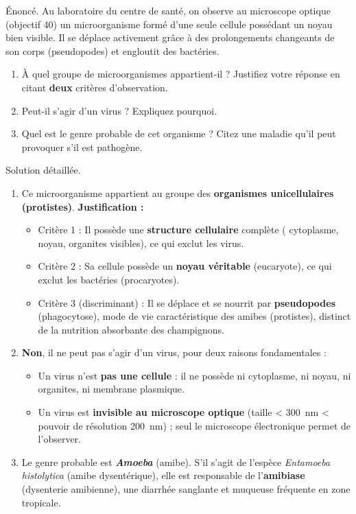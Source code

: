 \documentclass[11pt]{article}
\begin{document}
\begin{exoresolu}
Énoncé. Au laboratoire du centre de santé, on observe au microscope optique (objectif \SI{40}{\times}) un microorganisme formé d'une seule cellule possédant un noyau bien visible. Il se déplace activement grâce à des prolongements changeants de son corps (pseudopodes) et engloutit des bactéries.
\begin{enumerate}
\item À quel groupe de microorganismes appartient-il ? Justifiez votre réponse en citant \textbf{deux} critères d'observation.
\item Peut-il s'agir d'un virus ? Expliquez pourquoi.
\item Quel est le genre probable de cet organisme ? Citez une maladie qu'il peut provoquer s'il est pathogène.
\end{enumerate}
\tcblower
Solution détaillée.
\begin{enumerate}
\item Ce microorganisme appartient au groupe des \textbf{organismes unicellulaires (protistes)}.
      \textbf{Justification :}
      \begin{itemize}
      \item Critère 1 : Il possède une \textbf{structure cellulaire} complète ( cytoplasme, noyau, organites visibles), ce qui exclut les virus.
      \item Critère 2 : Sa cellule possède un \textbf{noyau véritable} (eucaryote), ce qui exclut les bactéries (procaryotes).
      \item Critère 3 (discriminant) : Il se déplace et se nourrit par \textbf{pseudopodes} (phagocytose), mode de vie caractéristique des amibes (protistes), distinct de la nutrition absorbante des champignons.
      \end{itemize}
\item \textbf{Non}, il ne peut pas s'agir d'un virus, pour deux raisons fondamentales :
      \begin{itemize}
      \item Un virus n'est \textbf{pas une cellule} : il ne possède ni cytoplasme, ni noyau, ni organites, ni membrane plasmique.
      \item Un virus est \textbf{invisible au microscope optique} (taille < \SI{300}{\nano\meter} < pouvoir de résolution \approx \SI{200}{\nano\meter}) ; seul le microscope électronique permet de l'observer.
      \end{itemize}
\item Le genre probable est \textbf{\emph{Amoeba}} (amibe). S'il s'agit de l'espèce \emph{Entamoeba histolytica} (amibe dysentérique), elle est responsable de l'\textbf{amibiase} (dysenterie amibienne), une diarrhée sanglante et muqueuse fréquente en zone tropicale.
\end{enumerate}
\end{exoresolu}
\end{document}
